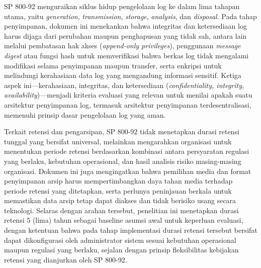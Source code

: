 SP 800-92 menguraikan siklus hidup pengelolaan log ke dalam lima tahapan utama, yaitu \textit{generation}, \textit{transmission}, \textit{storage}, \textit{analysis}, dan \textit{disposal}. Pada tahap penyimpanan, dokumen ini menekankan bahwa integritas dan ketersediaan log harus dijaga dari perubahan maupun penghapusan yang tidak sah, antara lain melalui pembatasan hak akses (\textit{append-only privileges}), penggunaan \textit{message digest} atau fungsi hash untuk memverifikasi bahwa berkas log tidak mengalami modifikasi selama penyimpanan maupun transfer, serta enkripsi untuk melindungi kerahasiaan data log yang mengandung informasi sensitif. Ketiga aspek ini---kerahasiaan, integritas, dan ketersediaan (\textit{confidentiality, integrity, availability})---menjadi kriteria evaluasi yang relevan untuk menilai apakah suatu arsitektur penyimpanan log, termasuk arsitektur penyimpanan terdesentralisasi, memenuhi prinsip dasar pengelolaan log yang aman.

Terkait retensi dan pengarsipan, SP 800-92 tidak menetapkan durasi retensi tunggal yang bersifat universal, melainkan mengarahkan organisasi untuk menentukan periode retensi berdasarkan kombinasi antara persyaratan regulasi yang berlaku, kebutuhan operasional, dan hasil analisis risiko masing-masing organisasi. Dokumen ini juga mengingatkan bahwa pemilihan media dan format penyimpanan arsip harus mempertimbangkan daya tahan media terhadap periode retensi yang ditetapkan, serta perlunya peninjauan berkala untuk memastikan data arsip tetap dapat diakses dan tidak berisiko usang secara teknologi. Selaras dengan arahan tersebut, penelitian ini menetapkan durasi retensi 5 (lima) tahun sebagai baseline asumsi awal untuk keperluan evaluasi, dengan ketentuan bahwa pada tahap implementasi durasi retensi tersebut bersifat dapat dikonfigurasi oleh administrator sistem sesuai kebutuhan operasional maupun regulasi yang berlaku, sejalan dengan prinsip fleksibilitas kebijakan retensi yang dianjurkan oleh SP 800-92.

